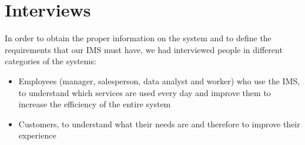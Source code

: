 \section{Interviews}

In order to obtain the proper information on the system and to define the requirements that our IMS must have, we had interviewed people in different categories of the systems:

\begin{itemize}
    \item Employees (manager, salesperson, data analyst and worker) who use the IMS, to understand which services are used every day and improve them to increase the efficiency of the entire system
    \item Customers, to understand what their needs are and therefore to improve their experience
\end{itemize}